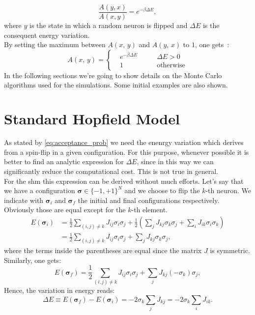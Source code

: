 \documentclass[\rootdir/main.tex]{subfiles}
\begin{document}
\begin{equation*}
    \frac{A(y, x)}{A(x, y)} = e^{- \beta \Delta E},
\end{equation*}
where $y$ is the state in which a random neuron is flipped and $\Delta E$ is the consequent energy variation.\\
By setting the maximum between $A(x,\, y)$ and $A(y,\, x)$ to $1$, one gets~\cite{binder2010monte}:
\begin{equation}\label{eq:acceptance_prob}
A(x, \,y) = 
\left\{
\begin{alignedat}{3}
 & e^{-\beta \Delta E} \qquad & \Delta  E > 0 \\
 & 1 \qquad & \text{otherwise}
\end{alignedat}
\right.
\end{equation}
In the following sections we're going to show details on the Monte Carlo algorithms used for the simulations.
Some initial examples are also shown.

\section{Standard Hopfield Model}
As stated by \cref{eq:acceptance_prob} we need the enenrgy variation which derives from a spin-flip in a given configuration. For this purpose, whenever possible it is better to find an analytic expression for $\Delta E$, since in this way we can significantly reduce the computational cost. This is not true in general.\\
For the \acrlong{shm} this expression can be derived without much efforts. Let's say that we have a configuration $\symbf{\sigma} \in \{-1, +1 \}^N$ and we choose to flip the $k$-th neuron. We indicate with $\symbf{\sigma}_i$ and $\symbf{\sigma}_f$ the initial and final configurations respectively. Obviously those are equal except for the $k$-th element.
\begin{equation*}
\begin{split}
        E(\symbf{\sigma}_i) & = \frac{1}{2} \sum_{(i, j) \neq k} J_{ij} \sigma_i \sigma_j + \frac{1}{2}\left(\sum_j J_{kj} \sigma_k \sigma_j + \sum_i J_{ik} \sigma_i \sigma_k \right) \\
        & = \frac{1}{2} \sum_{(i, j) \neq k} J_{ij} \sigma_i \sigma_j + \sum_j J_{kj} \sigma_k \sigma_j,
\end{split}
\end{equation*}
where the terms inside the parentheses are equal since the matrix $J$ is symmetric.\\
Similarly, one gets:
\begin{equation*}
        E(\symbf{\sigma}_f) = \frac{1}{2} \sum_{(i, j) \neq k} J_{ij} \sigma_i \sigma_j + \sum_j J_{kj} \left(-\sigma_k\right) \sigma_j,
\end{equation*}
Hence, the variation in energy reads:
\begin{equation}\label{eq:energy_var_shm}
    \Delta E \equiv E(\symbf{\sigma}_f) - E(\symbf{\sigma}_i) = -2 \sigma_k \sum_j J_{kj} = -2 \sigma_k \sum_i J_{ik}.
\end{equation}
\end{document}

